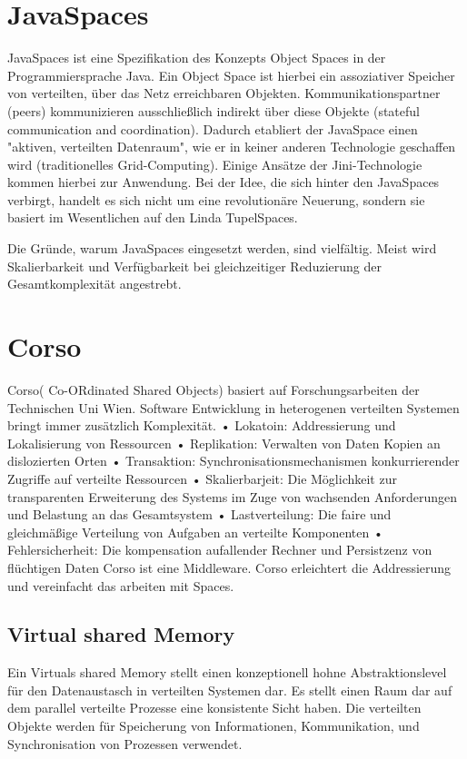 \documentclass[a4paper,12pt]{scrreprt}
\begin{document}
	\section{JavaSpaces}
		JavaSpaces ist eine Spezifikation des Konzepts Object Spaces in der Programmiersprache Java. Ein Object Space ist hierbei ein assoziativer Speicher von verteilten, über das Netz erreichbaren Objekten. Kommunikationspartner (peers) kommunizieren ausschließlich indirekt über diese Objekte (stateful communication and coordination). Dadurch etabliert der JavaSpace einen "aktiven, verteilten Datenraum", wie er in keiner anderen Technologie geschaffen wird (traditionelles Grid-Computing). Einige Ansätze der Jini-Technologie kommen hierbei zur Anwendung. Bei der Idee, die sich hinter den JavaSpaces verbirgt, handelt es sich nicht um eine revolutionäre Neuerung, sondern sie basiert im Wesentlichen auf den Linda TupelSpaces.
		
		Die Gründe, warum JavaSpaces eingesetzt werden, sind vielfältig. Meist wird Skalierbarkeit und Verfügbarkeit bei gleichzeitiger Reduzierung der Gesamtkomplexität angestrebt.
		
		
		\section{Corso}
			Corso( Co-ORdinated Shared Objects) basiert auf Forschungsarbeiten der Technischen Uni Wien.
			Software Entwicklung in heterogenen verteilten Systemen bringt immer zusätzlich Komplexität.
			•	Lokatoin: Addressierung und Lokalisierung von Ressourcen
			•	Replikation: Verwalten von Daten Kopien an dislozierten Orten
			•	Transaktion: Synchronisationsmechanismen konkurrierender Zugriffe auf verteilte Ressourcen
			•	Skalierbarjeit: Die Möglichkeit zur transparenten Erweiterung des Systems im Zuge von wachsenden Anforderungen und Belastung an das Gesamtsystem
			•	Lastverteilung: Die faire und gleichmäßige Verteilung von Aufgaben an verteilte Komponenten
			•	Fehlersicherheit:  Die kompensation aufallender Rechner und Persistzenz von flüchtigen Daten
			Corso ist eine Middleware. Corso erleichtert die Addressierung und vereinfacht das arbeiten mit Spaces.
			
			\subsection{Virtual shared Memory}
				Ein Virtuals shared Memory stellt einen konzeptionell hohne Abstraktionslevel für den Datenaustasch in verteilten Systemen dar.  Es stellt einen Raum dar auf dem parallel verteilte Prozesse eine konsistente Sicht haben. Die verteilten Objekte werden für Speicherung von Informationen, Kommunikation, und Synchronisation von Prozessen verwendet.
\end{document}
